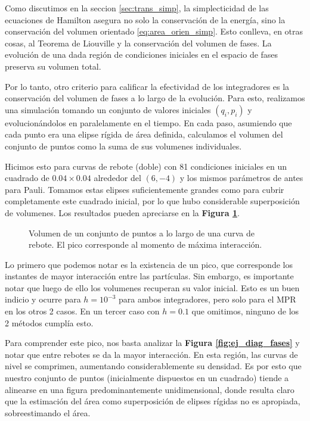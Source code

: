 Como discutimos en la seccion \ref{sec:trans_simp}, la simplecticidad de las ecuaciones de Hamilton asegura no solo la conservación de la energía, sino la conservación del volumen orientado \eqref{eq:area_orien_simp}.
Esto conlleva, en otras cosas, al Teorema de Liouville y la conservación del volumen de fases.
La evolución de una dada región de condiciones iniciales en el espacio de fases preserva su volumen total.

Por lo tanto, otro criterio para calificar la efectividad de los integradores es la conservación del volumen de fases a lo largo de la evolución.
Para esto, realizamos una simulación tomando un conjunto de valores iniciales $(q_i, p_i)$ y evolucionándolos en paralelamente en el tiempo.
En cada paso, asumiendo que cada punto era una elipse rígida de área definida, calculamos el volumen del conjunto de puntos como la suma de sus volumenes individuales.

Hicimos esto para curvas de rebote (doble) con 81 condiciones iniciales en un cuadrado de $0.04\times0.04$ alrededor del $(6, -4)$ y los mismos parámetros de antes para Pauli.
Tomamos estas elipses suficientemente grandes como para cubrir completamente este cuadrado inicial, por lo que hubo considerable superposición de volumenes.
Los resultados pueden apreciarse en la \textbf{Figura \ref{fig:vol_fas}}.

\begin{figure}[h]
	\centering
	\caption{Volumen de un conjunto de puntos a lo largo de una curva de rebote. El pico corresponde al momento de máxima interacción.}
	\label{fig:vol_fas}
\end{figure}

Lo primero que podemos notar es la existencia de un pico, que corresponde los instantes de mayor interacción entre las partículas.
Sin embargo, es importante notar que luego de ello los volumenes recuperan su valor inicial.
Esto es un buen indicio y ocurre para $h=10^{-3}$ para ambos integradores, pero solo para el MPR en los otros 2 casos.
En un tercer caso con $h=0.1$ que omitimos, ninguno de los 2 métodos cumplía esto.

Para comprender este pico, nos basta analizar la \textbf{Figura \ref{fig:ej_diag_fases}} y notar que entre rebotes se da la mayor interacción.
En esta región, las curvas de nivel se comprimen, aumentando considerablemente su densidad. 
Es por esto que nuestro conjunto de puntos (inicialmente dispuestos en un cuadrado) tiende a alinearse en una figura predominantemente unidimensional, donde resulta claro que la estimación del área 
como superposición de elipses rígidas no es apropiada, sobreestimando el área.


